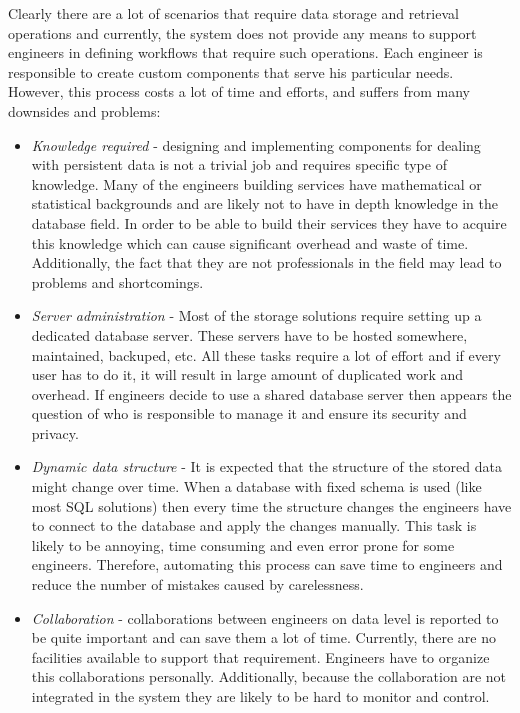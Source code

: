 Clearly there are a lot of scenarios that require data storage and retrieval operations and currently, the system does not provide any means to support engineers in defining workflows that require such operations. Each engineer is responsible to create custom components that serve his particular needs. However, this process costs a lot of time and efforts, and suffers from many downsides and problems:

\begin{itemize}
	\item \textit{Knowledge required} - designing and implementing components for dealing with persistent data is not a trivial job and requires specific type of knowledge. Many of the engineers building services have mathematical or statistical backgrounds and are likely not to have in depth knowledge in the database field. In order to be able to build their services they have to acquire this knowledge which can cause significant overhead and waste of time. Additionally, the fact that they are not professionals in the field may lead to problems and shortcomings.
	
	\item \textit{Server administration} - Most of the storage solutions require setting up a dedicated database server. These servers have to be hosted somewhere, maintained, backuped, etc. All these tasks require a lot of effort and if every user has to do it, it will result in large amount of duplicated work and overhead. If engineers decide to use a shared database server then appears the question of who is responsible to manage it and ensure its security and privacy.
	
	\item \textit{Dynamic data structure} - It is expected that the structure of the stored data might change over time. When a database with fixed schema is used (like most SQL solutions) then every time the structure changes the engineers have to connect to the database and apply the changes manually. This task is likely to be annoying, time consuming and even error prone for some engineers. Therefore, automating this process can save time to engineers and reduce the number of mistakes caused by carelessness. 
	
	\item \textit{Collaboration} - collaborations between engineers on data level is reported to be quite important and can save them a lot of time. Currently, there are no facilities available to support that requirement. Engineers have to organize this collaborations personally. Additionally, because the collaboration are not integrated in the system they are likely to be hard to monitor and control.
	

\end{itemize}
